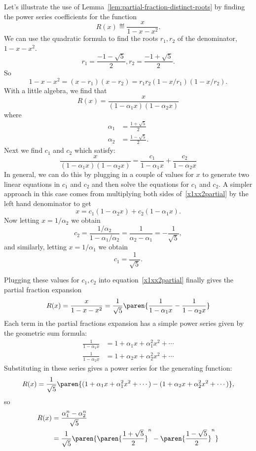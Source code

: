 Let's illustrate the use of Lemma~\ref{lem:partial-fraction-distinct-roots}
by finding the power series coefficients for the function
\[
R(x) \eqdef \frac{x}{1 - x - x^2}.
\]
We can use the quadratic formula to find the roots $r_1,r_2$ of the denominator, $1 - x - x^2$.
\[
r_1 = \frac{-1 -\sqrt{5}}{2}, r_2 = \frac{-1 + \sqrt{5}}{2}.
\]
So
\[
1 - x - x^2 = (x - r_1)(x - r_2) = r_1r_2(1-x/r_1)(1-x/r_2).
\]
With a little algebra, we find that
\[
R(x) = \frac{x}{(1-\alpha_1 x)(1-\alpha_2 x)}
\]
where
\begin{align*}
\alpha_1 & = \frac{1 + \sqrt{5}}{2}\\
\alpha_2 & = \frac{1 - \sqrt{5}}{2}.
\end{align*}
Next we find $c_1$ and $c_2$ which satisfy:
\begin{equation}\label{x1xx2partial}
\frac{x}{(1-\alpha_1 x)(1-\alpha_2 x)} =
      \frac{c_1}{1 - \alpha_1 x} + \frac{c_2}{1 - \alpha_2 x}
\end{equation}
In general, we can do this by plugging in a couple of values for $x$
to generate two linear equations in $c_1$ and $c_2$ and then solve the
equations for $c_1$ and $c_2$.  A simpler approach in this case comes
from multiplying both sides of~\eqref{x1xx2partial} by the left hand
denominator to get
\[
x = c_1(1 - \alpha_2 x) + c_2(1 - \alpha_1 x).
\]
Now letting $x = 1/\alpha_2$ we obtain
\[
c_2 = \frac{1/\alpha_2}{1-\alpha_1/\alpha_2} = \frac{1}{\alpha_2 - \alpha_1} = -\frac{1}{\sqrt{5}},
\]
and similarly, letting $x = 1/\alpha_1$ we obtain
\[
c_1 =\frac{1}{\sqrt{5}}.
\]
\iffalse
\begin{gather*}
c_1 = \frac{1}{\alpha_1 - \alpha_2} = \frac{1}{\sqrt{5}} \\
c_2 = \frac{-1}{\alpha_1 - \alpha_2} = -\frac{1}{\sqrt{5}}
\end{gather*}
\fi
Plugging these values for $c_1,c_2$ into
equation~\eqref{x1xx2partial} finally gives the partial fraction
expansion
%
\[
R(x) = \frac{x}{1 - x - x^2} =
      \frac{1}{\sqrt{5}}
      \paren{\frac{1}{1 - \alpha_1 x} - \frac{1}{1 - \alpha_2 x}}
\]
%
Each term in the partial fractions expansion has a simple power series
given by the geometric sum formula:
%
\begin{align*}
\frac{1}{1 - \alpha_1 x} & = 1 + \alpha_1 x + \alpha_1^2 x^2 + \cdots \\
\frac{1}{1 - \alpha_2 x} & = 1 + \alpha_2 x + \alpha_2^2 x^2 + \cdots
\end{align*}
%
Substituting in these series gives a power series for the generating
function:
%
\[
R(x)  =  \frac{1}{\sqrt{5}}
      \paren{(1 + \alpha_1 x + \alpha_1^2 x^2 + \cdots) -
      (1 + \alpha_2 x + \alpha_2^2 x^2 + \cdots)},
\]
so
\begin{align}
 [x^n]R(x) & = \frac{\alpha_1^n - \alpha_2^n}{\sqrt{5}} \notag \\
           & = \frac{1}{\sqrt{5}}
      \paren{
      \paren{\frac{1 + \sqrt{5}}{2}}^n -
      \paren{\frac{1 - \sqrt{5}}{2}}^n
      }     \label{fib-coeff}
\end{align}

